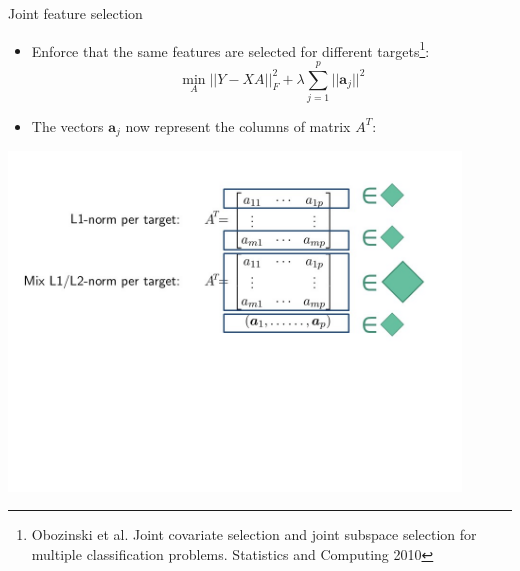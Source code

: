 \documentclass[]{beamer}
\renewcommand{\vec}[1]{\boldsymbol{#1}}
\begin{document}
\begin{frame}{Joint feature selection}
\begin{itemize}
\item Enforce that the same features are selected for different targets\footnote{Obozinski et al. Joint covariate selection and joint subspace selection
for multiple classification problems. Statistics and Computing 2010}:
$$
\min_A ||Y - XA ||^2_F + \lambda \sum_{j=1}^p ||\vec{a}_j||^2  
$$ \pause 
\item The vectors $\vec{a}_j$ now represent the columns of matrix $A^T$:
\end{itemize}
\begin{center}
\includegraphics[width=0.9\textwidth,trim = 0 240 30 50,clip]{Figures/pictures/Dia21}
\end{center}
\end{frame}
\end{document}
